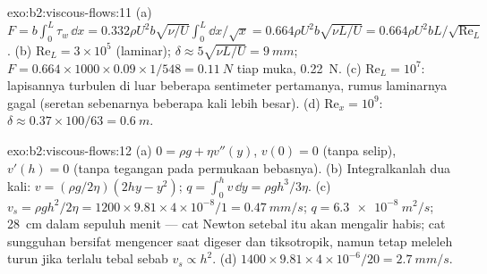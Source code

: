 \begin{solution}{exo:b2:viscous-flows:11}
(a) $F = b\int_0^L\tau_w\,\dd x = 0.332\rho U^2b\sqrt{\nu/U}\int_0^L\dd x/\sqrt x =
0.664\rho U^2b\sqrt{\nu L/U} = 0.664\rho U^2bL/\sqrt{\mathrm{Re}_L}$. (b) $\mathrm{Re}_L =
3 \times 10^5$ (laminar); $\delta \approx 5\sqrt{\nu L/U} = \qty{9}{mm}$; $F = 0.664 \times 1000
\times 0.09 \times 1/548 = \qty{0.11}{N}$ tiap muka, \qty{0.22}{N}. (c) $\mathrm{Re}_L = 10^7$:
lapisannya turbulen di luar beberapa sentimeter pertamanya, rumus laminarnya
gagal (seretan sebenarnya beberapa kali lebih besar). (d) $\mathrm{Re}_x =
10^9$: $\delta \approx 0.37 \times 100/63 = \qty{0.6}{m}$.
\end{solution}

\begin{solution}{exo:b2:viscous-flows:12}
(a) $0 = \rho g + \eta v''(y)$, $v(0) = 0$ (tanpa selip), $v'(h) = 0$ (tanpa tegangan pada
permukaan bebasnya). (b) Integralkanlah dua kali: $v = (\rho g/2\eta)(2hy - y^2)$; $q =
\int_0^hv\,\dd y = \rho gh^3/3\eta$. (c) $v_s = \rho gh^2/2\eta = 1200 \times 9.81 \times
4 \times 10^{-8}/1 = \qty{0.47}{mm/s}$; $q = \qty{6.3e-8}{m^2/s}$; \qty{28}{cm} dalam sepuluh
menit --- cat Newton setebal itu akan mengalir habis; cat
sungguhan bersifat mengencer saat digeser dan tiksotropik, namun tetap meleleh turun jika terlalu tebal
sebab $v_s \propto h^2$. (d) $1400 \times 9.81 \times 4 \times 10^{-6}/20 = \qty{2.7}{mm/s}$.
\end{solution}

